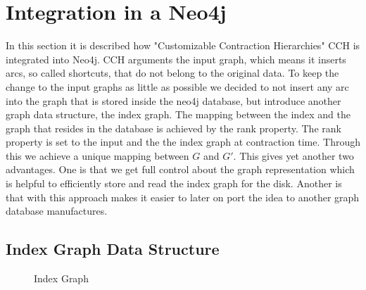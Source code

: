\chapter{Integration in a Neo4j}

In this section it is described how "Customizable Contraction Hierarchies" CCH is integrated into Neo4j. CCH arguments the input graph, which means it inserts arcs, so called shortcuts, that do not belong to the original data. To keep the change to the input graphs as little as possible we decided to not insert any arc into the graph that is stored inside the neo4j database, but introduce another graph data structure, the index graph. 
The mapping between the index and the graph that resides in the database is achieved by the rank property. The rank property is set to the input and the the index graph at contraction time. Through this we achieve a unique mapping between $G$ and $G'$.
This gives yet another two advantages. One is that we get full control about the graph representation which is helpful to efficiently store and read the index graph for the disk. Another is that with this approach makes it easier to later on port the idea to another graph database manufactures.

\section{Index Graph Data Structure}\label{sec:index_graph}

\begin{figure}
     
    
    \caption{Index Graph}
    \label{uml:index_graph}
\end{figure}

